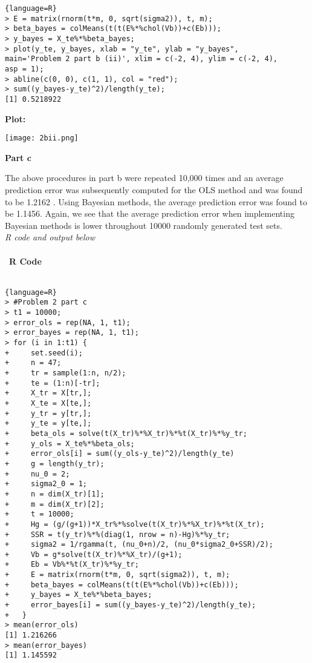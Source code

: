 \documentclass[12pt]{article}
\newenvironment{problem}[2][Problem]{\begin{trivlist}
\item[\hskip \labelsep {\bfseries #1}\hskip \labelsep {\bfseries #2.}]}{\end{trivlist}}
\begin{document}
\begin{problem}{2}
\begin{lstlisting}{language=R}
> E = matrix(rnorm(t*m, 0, sqrt(sigma2)), t, m);
> beta_bayes = colMeans(t(t(E%*%chol(Vb))+c(Eb)));
> y_bayes = X_te%*%beta_bayes;
> plot(y_te, y_bayes, xlab = "y_te", ylab = "y_bayes", 
main='Problem 2 part b (ii)', xlim = c(-2, 4), ylim = c(-2, 4), 
asp = 1);
> abline(c(0, 0), c(1, 1), col = "red");
> sum((y_bayes-y_te)^2)/length(y_te);
[1] 0.5218922
\end{lstlisting} 
\textbf{Plot:} \\
\begin{center}
\texttt{[image: 2bii.png]}
\end{center}
\newpage
\begin{flushleft}
\textbf{Part c}
\end{flushleft}
The above procedures in part b were repeated 10,000 times and an average prediction error was subsequently computed for the OLS method and was found to be 1.2162 . Using Bayesian methods, the average prediction error was found to be 1.1456. Again, we see that the average prediction error when implementing Bayesian methods is lower throughout 10000 randomly generated test sets. 
\\
\textit{R code and output below}\\
\\\
\textbf{R Code} 
\\\
\begin{lstlisting}{language=R}
> #Problem 2 part c
> t1 = 10000;
> error_ols = rep(NA, 1, t1);
> error_bayes = rep(NA, 1, t1);
> for (i in 1:t1) {
+     set.seed(i);
+     n = 47;
+     tr = sample(1:n, n/2);
+     te = (1:n)[-tr];
+     X_tr = X[tr,];
+     X_te = X[te,];
+     y_tr = y[tr,];
+     y_te = y[te,];
+     beta_ols = solve(t(X_tr)%*%X_tr)%*%t(X_tr)%*%y_tr;
+     y_ols = X_te%*%beta_ols;
+     error_ols[i] = sum((y_ols-y_te)^2)/length(y_te)
+     g = length(y_tr);
+     nu_0 = 2;
+     sigma2_0 = 1;
+     n = dim(X_tr)[1];
+     m = dim(X_tr)[2];
+     t = 10000;
+     Hg = (g/(g+1))*X_tr%*%solve(t(X_tr)%*%X_tr)%*%t(X_tr);
+     SSR = t(y_tr)%*%(diag(1, nrow = n)-Hg)%*%y_tr;
+     sigma2 = 1/rgamma(t, (nu_0+n)/2, (nu_0*sigma2_0+SSR)/2);
+     Vb = g*solve(t(X_tr)%*%X_tr)/(g+1);
+     Eb = Vb%*%t(X_tr)%*%y_tr;
+     E = matrix(rnorm(t*m, 0, sqrt(sigma2)), t, m);
+     beta_bayes = colMeans(t(t(E%*%chol(Vb))+c(Eb)));
+     y_bayes = X_te%*%beta_bayes;
+     error_bayes[i] = sum((y_bayes-y_te)^2)/length(y_te);
+   }
> mean(error_ols)
[1] 1.216266
> mean(error_bayes)
[1] 1.145592
\end{lstlisting}
\end{problem}
\end{document}
